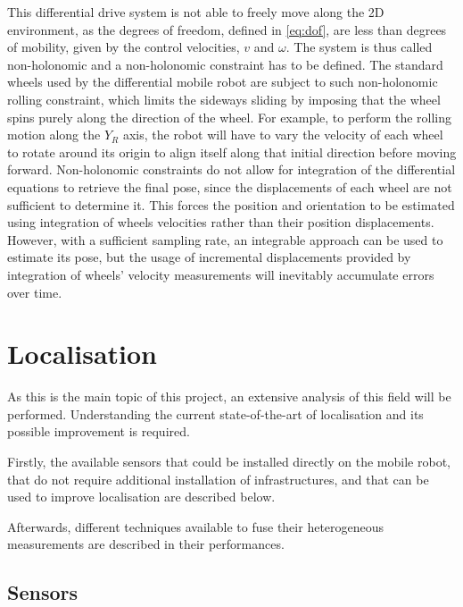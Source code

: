 \noindent
This differential drive system is not able to freely move along the \gls{2D} environment, as the degrees of freedom, defined in \eqref{eq:dof}, are less than degrees of mobility, given by the control velocities, $v$ and $\omega$.
The system is thus called non-holonomic and a non-holonomic constraint has to be defined.
The standard wheels used by the differential mobile robot are subject to such non-holonomic rolling constraint, which limits the sideways sliding by imposing that the wheel spins purely along the direction of the wheel.
For example, to perform the rolling motion along the $Y_R$ axis, the robot will have to vary the velocity of each wheel to rotate around its origin to align itself along that initial direction before moving forward.
Non-holonomic constraints do not allow for integration of the differential equations to retrieve the final pose, since the displacements of each wheel are not sufficient to determine it.
This forces the position and orientation to be estimated using integration of wheels velocities rather than their position displacements.
However, with a sufficient sampling rate, an integrable approach can be used to estimate its pose, but the usage of incremental displacements provided by integration of wheels' velocity measurements will inevitably accumulate errors over time.


\section{Localisation}


\noindent As this is the main topic of this project, an extensive analysis of this field will be performed.
Understanding the current state-of-the-art of localisation and its possible improvement is required.

Firstly, the available sensors that could be installed directly on the mobile robot, that do not require additional installation of infrastructures, and that can be used to improve localisation are described below.

Afterwards, different techniques available to fuse their heterogeneous measurements are described in their performances.


\subsection{Sensors}



